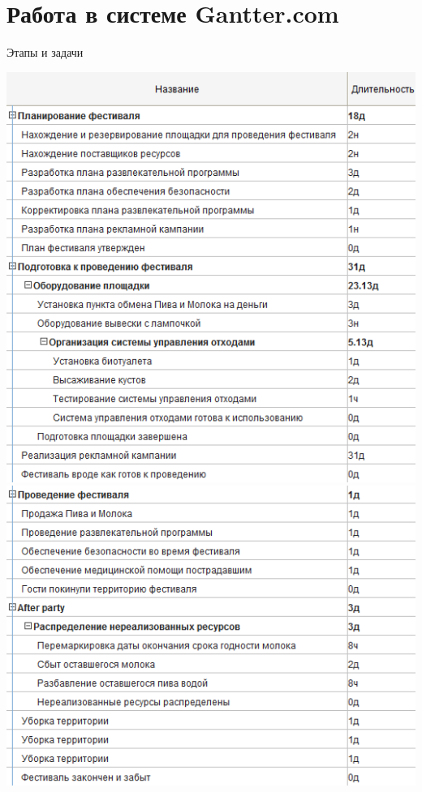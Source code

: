 \documentclass[10pt,pdf,hyperref=unicode,hyperref={bookmarks=false}]{beamer}
\begin{document}
  \section{Работа в системе Gantter.com}
    \begin{frame}[allowframebreaks]{Этапы и задачи}
      \begin{center}
        \includegraphics[keepaspectratio=true,width=\textwidth,height=0.8\textheight]{tasks1.png}\\
        \framebreak
        \includegraphics[keepaspectratio=true,width=\textwidth,height=0.8\textheight]{tasks2.png}

\end{center}
\end{frame}
\end{document}
